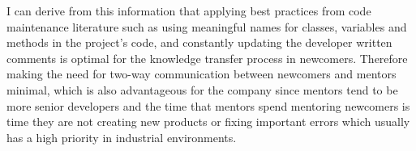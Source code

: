 \documentclass[12pt, letterpaper]{article}
\begin{document}
I can derive from this information that applying best practices from code maintenance literature such as 
using meaningful names for classes, variables and methods in the project's code, and constantly updating
the developer written comments is optimal for the knowledge transfer process in newcomers. Therefore making
the need for two-way communication between newcomers and mentors minimal, which is also advantageous for the
company since mentors tend to be more senior developers and the time that mentors spend mentoring newcomers
is time they are not creating new products or fixing important errors which usually has a high priority
in industrial environments.

 




 
\end{document}

